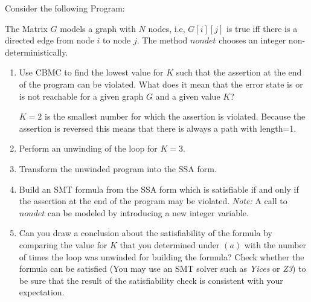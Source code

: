 Consider the following Program:



The Matrix $G$ models a graph with $N$ nodes, i.e, $G[i][j]$ is true iff there is a directed edge from node $i$ to node $j$. The method $\mathit{nondet}$ chooses an integer non-deterministically.

\begin{enumerate}
	\item Use CBMC to find the lowest value for $K$ such that the assertion at the end of the program can be violated. What does it mean that the error state is or is not reachable for a given graph $G$ and a given value $K$?
	  
	$K=2$ is the smallest number for which the assertion is violated. Because the assertion is reversed this means that there is always a path with length=1.

	\item Perform an unwinding of the loop for $K = 3$.
	\item Transform the unwinded program into the SSA form.
	\item Build an SMT formula from the SSA form which is satisfiable if and only if the assertion at the end of the program may be violated. {\em Note:} A call to $\mathit{nondet}$ can be modeled by introducing a new integer variable.
        \item Can you draw a conclusion about the satisfiability of the formula by comparing the value for $K$ that you determined under $(a)$ with the number of times the loop was unwinded for building the formula? Check whether the formula can be satisfied (You may use an SMT solver such as {\em Yices} or {\em Z3}) to be sure that the result of the satisfiability check is consistent with your expectation.
\end{enumerate}

